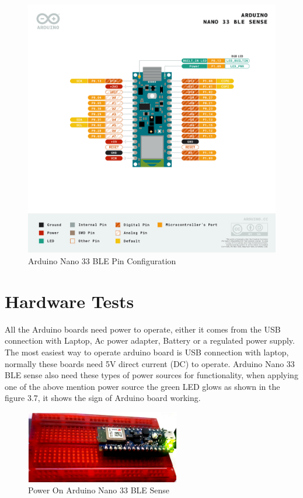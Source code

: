 \begin{figure}[h!]
	\centering
	\includegraphics[width=1.1\textwidth]{Images/hardware/pinout}
	\caption{Arduino Nano 33 BLE Pin Configuration} \label{fig:pinout}
\end{figure}

\section{Hardware Tests}

All the Arduino boards need power to operate, either it comes from the USB connection
with Laptop, Ac power adapter, Battery or a regulated power supply. The most easiest
way to operate arduino board is USB connection with laptop, normally these boards
need 5V direct current (DC) to operate. Arduino Nano 33 BLE sense also need these
types of power sources for functionality, when applying one of the above mention power
source the green LED glows as shown in the figure 3.7, it shows the sign of Arduino
board working.

\begin{figure}[h!]
	\centering
	\includegraphics[width=0.6\textwidth]{Images/hardware/Power-On-Arduino-Nano-33-BLE-Sense}
	\caption{Power On Arduino Nano 33 BLE Sense} \label{fig:Power-On-Arduino-Nano-33-BLE-Sense}
\end{figure}

